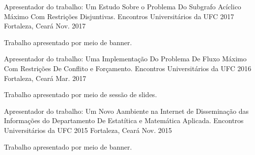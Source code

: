 

\begin{cventries}
  \cventry
    {Apresentador do trabalho: Um Estudo Sobre o Problema Do Subgrafo Acíclico Máximo Com Restrições Disjuntivas.} %
    {Encontros Universitários da UFC 2017} %
    {Fortaleza, Ceará} %
    {Nov. 2017} %
    {
      \begin{cvitems} %
        \item {Trabalho apresentado por meio de banner.}
      \end{cvitems}
    }
    
\vskip 0.2cm        
  \cventry
    {Apresentador do trabalho: Uma Implementação Do Problema De Fluxo Máximo Com Restrições De Conflito e Forçamento.} %
    {Encontros Universitários da UFC 2016} %
    {Fortaleza, Ceará} %
    {Mar. 2017} %
    {
      \begin{cvitems} %
        \item {Trabalho apresentado por meio de sessão de slides.}
      \end{cvitems}
    }
\vskip 0.2cm
  \cventry
    {Apresentador do trabalho: Um Novo Aambiente na Internet de Disseminação
    das Informações do Departamento De Estatítica e Matemática Aplicada.} %
    {Encontros Universitários da UFC 2015} %
    {Fortaleza, Ceará} %
    {Nov. 2015} %
    {
      \begin{cvitems} %
        \item {Trabalho apresentado por meio de banner.}
      \end{cvitems}
    }




\end{cventries}

